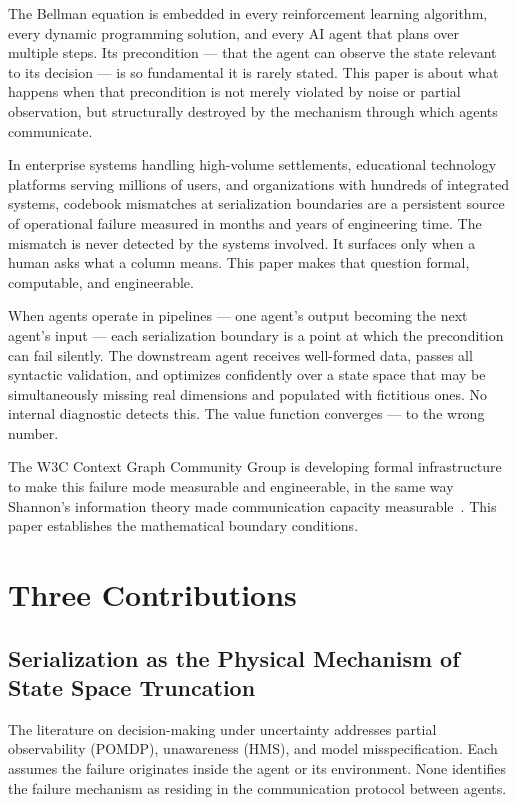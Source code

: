 \documentclass[11pt,a4paper]{article}
\begin{document}
The Bellman equation is embedded in every reinforcement learning 
algorithm, every dynamic programming solution, and every AI agent 
that plans over multiple steps. Its precondition --- that the agent 
can observe the state relevant to its decision --- is so fundamental 
it is rarely stated. This paper is about what happens when that 
precondition is not merely violated by noise or partial observation, 
but structurally destroyed by the mechanism through which agents 
communicate.

In enterprise systems handling high-volume settlements, educational 
technology platforms serving millions of users, and organizations with 
hundreds of integrated systems, codebook mismatches at serialization 
boundaries are a persistent source of operational failure measured in 
months and years of engineering time. The mismatch is never detected 
by the systems involved. It surfaces only when a human asks what a 
column means. This paper makes that question formal, computable, and 
engineerable.

When agents operate in pipelines --- one agent's output becoming the 
next agent's input --- each serialization boundary is a point at which 
the precondition can fail silently. The downstream agent receives 
well-formed data, passes all syntactic validation, and optimizes 
confidently over a state space that may be simultaneously missing real 
dimensions and populated with fictitious ones. No internal diagnostic 
detects this. The value function converges --- to the wrong number.

The W3C Context Graph Community Group is developing formal 
infrastructure to make this failure mode measurable and engineerable, 
in the same way Shannon's information theory made communication 
capacity measurable~\cite{shannon1948}. This paper establishes the 
mathematical boundary conditions.


\section{Three Contributions}
\label{sec:novelty}

\subsection{Serialization as the Physical Mechanism of State Space 
Truncation}

The literature on decision-making under uncertainty addresses partial 
observability (POMDP), unawareness (HMS), and model misspecification. 
Each assumes the failure originates inside the agent or its environment. 
None identifies the failure mechanism as residing in the communication 
protocol between agents.
\end{document}
